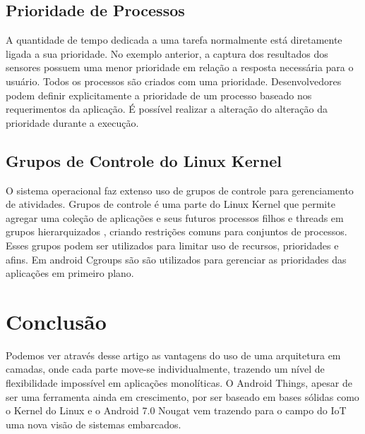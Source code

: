 \documentclass[12pt]{article}
\begin{document}
\subsection{Prioridade de Processos}
A quantidade de tempo dedicada a uma tarefa normalmente está diretamente ligada a sua prioridade. No exemplo anterior, a captura dos resultados dos sensores possuem uma menor prioridade em relação a resposta necessária para o usuário. Todos os processos são criados com uma prioridade. Desenvolvedores podem definir explicitamente a prioridade de um processo baseado nos requerimentos da aplicação. É possível realizar a alteração do alteração da prioridade durante a execução.
\subsection{Grupos de Controle do Linux Kernel}
O sistema operacional faz extenso uso de grupos de controle para gerenciamento de atividades. Grupos de controle é uma parte do Linux Kernel que permite agregar uma coleção de aplicações e seus futuros processos filhos e threads em grupos hierarquizados \cite{martin}, criando restrições comuns para conjuntos de processos. Esses grupos podem ser utilizados para limitar uso de recursos, prioridades e afins. Em android Cgroups são são utilizados para gerenciar as prioridades das aplicações em primeiro plano.
\section{Conclusão}
Podemos ver através desse artigo as vantagens do uso de uma arquitetura em camadas, onde cada parte move-se individualmente, trazendo um nível de flexibilidade impossível em aplicações monolíticas. O Android Things, apesar de ser uma ferramenta ainda em crescimento, por ser baseado em bases sólidas como o Kernel do Linux e o Android 7.0 Nougat vem trazendo para o campo do IoT uma nova visão de sistemas embarcados.



\end{document}
